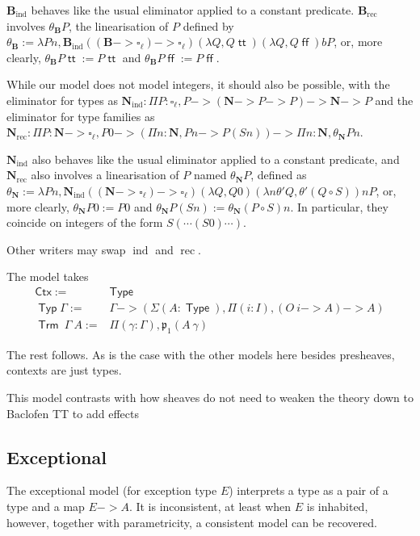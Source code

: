 \documentclass[11pt]{article}
\DeclareMathOperator{\Type}{\mathsf{Type}}
\DeclareMathOperator{\rec}{rec}
\DeclareMathOperator{\ind}{ind}
\DeclareMathOperator{\Typ}{\mathsf{Typ}}
\DeclareMathOperator{\Trm}{\mathsf{Trm}}
\DeclareMathOperator{\true}{\mathsf{tt}}
\DeclareMathOperator{\false}{\mathsf{ff}}
\newcommand{\0}{\mathbf{0}}
\newcommand{\1}{\mathbf{1}}
\newcommand{\nat}{\mathbf{N}}
\newcommand{\bool}{\mathbf{B}}
\begin{document}
$\bool_{\ind}$ behaves like the usual eliminator applied to a constant predicate. $\bool_{\rec}$ involves $\theta_\bool P$, the linearisation of $P$ defined by $\theta_\bool:= \lambda P n, \bool_{\ind} ((\bool ->\square_\ell) -> \square_\ell) (\lambda Q, Q \true) (\lambda Q, Q \false) b P$, or, more clearly, $\theta_\bool P \true := P \true$ and $\theta_\bool P \false :=  P \false$.


While our model does not model integers, it should also be possible, with the eliminator for types as $\nat_{\ind} : \Pi P : \square_\ell, P -> (\nat ->P -> P) -> \nat -> P $ and the eliminator for type families as $\nat_{\rec} : \Pi P : \nat -> \square_\ell, P 0 -> (\Pi n :\nat, P n -> P (S n)) -> \Pi n : \nat, \theta_\nat P n$.

$\nat_{\ind}$ also behaves like the usual eliminator applied to a constant predicate, and $\nat_{\rec}$ also involves a linearisation of $P$ named $\theta_\nat P$, defined as $\theta_\nat:= \lambda P n, \nat_{\ind} ((\nat ->\square_\ell) -> \square_\ell) (\lambda Q, Q 0) (\lambda n \theta' Q, \theta' (Q\circ S)) n P$, or, more clearly, $\theta_\nat P 0 := P 0$ and $\theta_\nat P (S n) := \theta_\nat (P\circ S) n$. In particular, they coincide on  integers of the form $S(\cdots (S 0)\cdots)$.

Other writers may swap $\ind$ and $\rec$.

The model takes
$$
    \begin{array}{rl}
        \mathsf{Ctx} :=& \Type\\
        \Typ\Gamma :=&\Gamma -> (\Sigma (A : \Type), \Pi(i:I), (O\ i-> A)->A)\\
        \Trm\ \Gamma\ A := & \Pi (\gamma:\Gamma), \mathfrak{p}_1 (A\ \gamma)
    \end{array}
$$

The rest follows. As is the case with the other models here besides presheaves, contexts are just types.

This model contrasts with how sheaves do not need to weaken the theory down to Baclofen TT to add effects

\subsection{Exceptional}

The exceptional model (for exception type $E$) interprets a type as a pair of a type and a map $E -> A$. It is inconsistent, at least when $E$ is inhabited, however, together with parametricity, a consistent model can be recovered.
\end{document}

